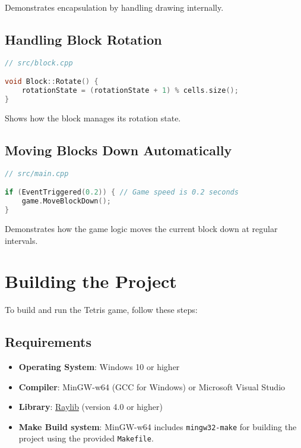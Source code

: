 \documentclass{article}
\begin{document}
Demonstrates encapsulation by handling drawing internally.

\subsection{Handling Block Rotation}

\begin{lstlisting}[language=C++]
// src/block.cpp

void Block::Rotate() {
    rotationState = (rotationState + 1) % cells.size();
}
\end{lstlisting}

Shows how the block manages its rotation state.

\subsection{Moving Blocks Down Automatically}

\begin{lstlisting}[language=C++]
// src/main.cpp

if (EventTriggered(0.2)) { // Game speed is 0.2 seconds
    game.MoveBlockDown();
}
\end{lstlisting}

Demonstrates how the game logic moves the current block down at regular intervals.

\section{Building the Project}

To build and run the Tetris game, follow these steps:

\subsection{Requirements}

\begin{itemize}
    \item \textbf{Operating System}: Windows 10 or higher
    \item \textbf{Compiler}: MinGW-w64 (GCC for Windows) or Microsoft Visual Studio
    \item \textbf{Library}: \href{https://www.raylib.com/}{Raylib} (version 4.0 or higher)
    \item \textbf{Make Build system}: MinGW-w64 includes \texttt{mingw32-make} for building the project using the provided \texttt{Makefile}.
\end{itemize}
\end{document}
